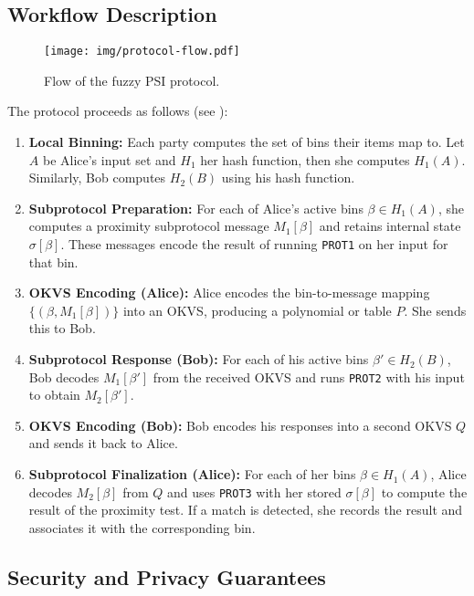 \subsection{Workflow Description}

\begin{figure}
	\centering
	\texttt{[image: img/protocol-flow.pdf]}
	\caption{Flow of the fuzzy PSI protocol.}
	\label{fig:protocol-flow}
\end{figure}

The protocol proceeds as follows (see ):

\begin{enumerate}
	\item \textbf{Local Binning:} Each party computes the set of bins their items map to. Let $A$ be Alice's input set and $H_1$ her hash function, then she computes $H_1(A)$. Similarly, Bob computes $H_2(B)$ using his hash function.

	\item \textbf{Subprotocol Preparation:} For each of Alice's active bins $\beta \in H_1(A)$, she computes a proximity subprotocol message $M_1[\beta]$ and retains internal state $\sigma[\beta]$. These messages encode the result of running \texttt{PROT1} on her input for that bin.

	\item \textbf{OKVS Encoding (Alice):} Alice encodes the bin-to-message mapping $\{(\beta, M_1[\beta])\}$ into an OKVS, producing a polynomial or table $P$. She sends this to Bob.

	\item \textbf{Subprotocol Response (Bob):} For each of his active bins $\beta' \in H_2(B)$, Bob decodes $M_1[\beta']$ from the received OKVS and runs \texttt{PROT2} with his input to obtain $M_2[\beta']$.

	\item \textbf{OKVS Encoding (Bob):} Bob encodes his responses into a second OKVS $Q$ and sends it back to Alice.

	\item \textbf{Subprotocol Finalization (Alice):} For each of her bins $\beta \in H_1(A)$, Alice decodes $M_2[\beta]$ from $Q$ and uses \texttt{PROT3} with her stored $\sigma[\beta]$ to compute the result of the proximity test. If a match is detected, she records the result and associates it with the corresponding bin.
\end{enumerate}

\subsection{Security and Privacy Guarantees}

